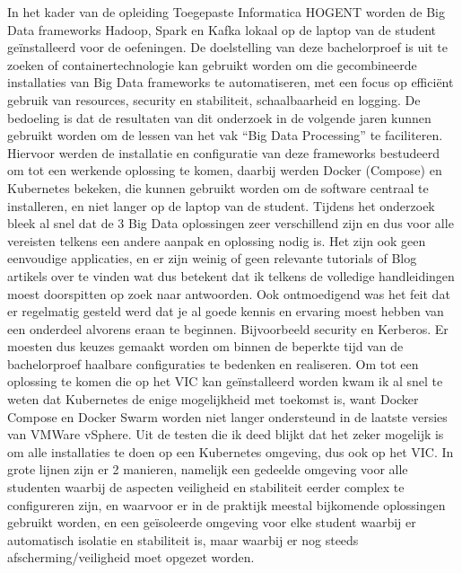 In het kader van de opleiding Toegepaste Informatica HOGENT worden de Big Data frameworks Hadoop, Spark en Kafka lokaal op de laptop van de student geïnstalleerd voor de oefeningen.
De doelstelling van deze bachelorproef is uit te zoeken of containertechnologie kan gebruikt worden om die gecombineerde installaties van Big Data frameworks te automatiseren, met een focus op efficiënt gebruik van resources, security en stabiliteit, schaalbaarheid en logging. De bedoeling is dat de resultaten van dit onderzoek in de volgende jaren kunnen gebruikt worden om de lessen van het vak ``Big Data Processing'' te faciliteren.
\newline
\newline
Hiervoor werden de installatie en configuratie van deze frameworks bestudeerd om tot een werkende oplossing te komen, daarbij werden Docker (Compose) en Kubernetes bekeken, die kunnen gebruikt worden om de software centraal te installeren, en niet langer op de laptop van de student.
\newline
\newline
Tijdens het onderzoek bleek al snel dat de 3 Big Data oplossingen zeer verschillend zijn en dus voor alle vereisten telkens een andere aanpak en oplossing nodig is.
Het zijn ook geen eenvoudige applicaties, en er zijn weinig of geen relevante tutorials of Blog artikels over te vinden wat dus betekent dat ik telkens de volledige handleidingen moest doorspitten op zoek naar antwoorden. Ook ontmoedigend was het feit dat er regelmatig gesteld werd dat je al goede kennis en ervaring moest hebben van een onderdeel alvorens eraan te beginnen. Bijvoorbeeld security en Kerberos.
\newline
Er moesten dus keuzes gemaakt worden om binnen de beperkte tijd van de bachelorproef haalbare configuraties te bedenken en realiseren.
\newline
\newline
Om tot een oplossing te komen die op het VIC kan geïnstalleerd worden kwam ik al snel te weten dat Kubernetes de enige mogelijkheid met toekomst is, want Docker Compose en Docker Swarm worden niet langer ondersteund in de laatste versies van VMWare vSphere.
\newline
\newline
Uit de testen die ik deed blijkt dat het zeker mogelijk is om alle installaties te doen op een Kubernetes omgeving, dus ook op het VIC. In grote lijnen zijn er 2 manieren, namelijk een gedeelde omgeving voor alle studenten waarbij de aspecten veiligheid en stabiliteit eerder complex te configureren zijn, en waarvoor er in de praktijk meestal bijkomende oplossingen gebruikt worden, en een geïsoleerde omgeving voor elke student waarbij er automatisch isolatie en stabiliteit is, maar waarbij er nog steeds afscherming/veiligheid moet opgezet worden.
